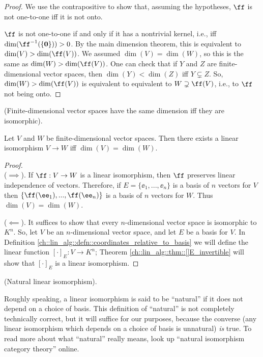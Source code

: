 \begin{proof}
    We use the contrapositive to show that, assuming the hypotheses, $\ff$ is not one-to-one iff it is not onto.
    
    $\ff$ is not one-to-one if and only if it has a nontrivial kernel, i.e., iff $\dim(\ff^{-1}(\{\mathbf{0}\})) > 0$. By the main dimension theorem, this is equivalent to $\dim(V) > \dim(\ff(V))$. We assumed $\dim(V) = \dim(W)$, so this is the same as $\dim(W) > \dim(\ff(V))$. One can check that if $Y$ and $Z$ are finite-dimensional vector spaces, then $\dim(Y) < \dim(Z)$ iff $Y \subsetneq Z$. So, $\dim(W) > \dim(\ff(V))$ is equivalent to equivalent to $W \supsetneq \ff(V)$, i.e., to $\ff$ not being onto.
\end{proof}

\begin{theorem}
\label{ch::lin_alg::thm::same_dim_iff_isomorphic}
    (Finite-dimensional vector spaces have the same dimension iff they are isomorphic).
    
    Let $V$ and $W$ be finite-dimensional vector spaces. Then there exists a linear isomorphism $V \rightarrow W$ iff $\dim(V) = \dim(W)$.
\end{theorem}

\begin{proof}
    \mbox{} \\ \indent
    ($\implies$). If $\ff:V \rightarrow W$ is a linear isomorphism, then $\ff$ preserves linear independence of vectors. Therefore, if $E = \{\ee_1, ..., \ee_n\}$ is a basis of $n$ vectors for $V$ then $\{\ff(\ee_1), ..., \ff(\ee_n)\}$ is a basis of $n$ vectors for $W$. Thus $\dim(V) = \dim(W)$.
    
    ($\impliedby$). It suffices to show that every $n$-dimensional vector space is isomorphic to $K^n$. So, let $V$ be an $n$-dimensional vector space, and let $E$ be a basis for $V$. In Definition \ref{ch::lin_alg::defn::coordinates_relative_to_basis} we will define the linear function $[\cdot]_E:V \rightarrow K^n$; Theorem \ref{ch::lin_alg::thm::[]E_invertible} will show that $[\cdot]_E$ is a linear isomorphism.
\end{proof}

\begin{defn}
\label{ch::lin_alg::defn::natural_iso}
    (Natural linear isomorphism).
    
    Roughly speaking, a linear isomorphism is said to be ``natural'' if it does not depend on a choice of basis. This definition of ``natural'' is not completely technically correct, but it will suffice for our purposes, because the converse (any linear isomorphism which depends on a choice of basis is unnatural) \textit{is} true. To read more about what ``natural'' really means, look up ``natural isomorphism category theory'' online.
\end{defn}

